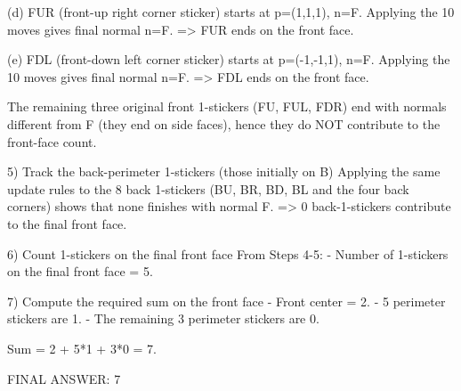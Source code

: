 (d) FUR (front-up right corner sticker) starts at p=(1,1,1), n=F.
Applying the 10 moves gives final normal n=F.
=> FUR ends on the front face.

(e) FDL (front-down left corner sticker) starts at p=(-1,-1,1), n=F.
Applying the 10 moves gives final normal n=F.
=> FDL ends on the front face.

The remaining three original front 1-stickers (FU, FUL, FDR) end with normals different from F (they end on side faces), hence they do NOT contribute to the front-face count.

5) Track the back-perimeter 1-stickers (those initially on B)
Applying the same update rules to the 8 back 1-stickers (BU, BR, BD, BL and the four back corners) shows that none finishes with normal F.
=> 0 back-1-stickers contribute to the final front face.

6) Count 1-stickers on the final front face
From Steps 4-5:
- Number of 1-stickers on the final front face = 5.

7) Compute the required sum on the front face
- Front center = 2.
- 5 perimeter stickers are 1.
- The remaining 3 perimeter stickers are 0.

Sum = 2 + 5*1 + 3*0 = 7.

FINAL ANSWER: 7
